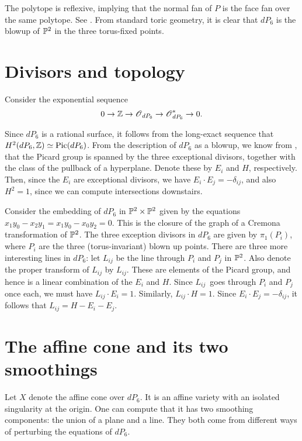 The polytope is reflexive, implying that the normal fan of $P$ is the face fan over the same polytope. See . From standard toric geometry, it is clear that $dP_6$ is the blowup of $\mathbb{P}^2$ in the three torus-fixed points. 

\section{Divisors and topology}

Consider the exponential sequence
\[
0 \to \mathbb{Z} \to \operatorname{\mathscr{O}}_{dP_6} \to \operatorname{\mathscr{O}}_{dP_6}^\ast \to 0.
\]

Since $dP_6$ is a rational surface, it follows from the long-exact sequence that $H^2(dP_6,\mathbb{Z}) \simeq \operatorname{Pic}(dP_6)$. From the description of $dP_6$ as a blowup, we know from \cite[Chapter V]{hartshorne}, that the Picard group is spanned by the three exceptional divisors, together with the class of the pullback of a hyperplane. Denote these by $E_i$ and $H$, respectively. Then, since the $E_i$ are exceptional divisors, we have $E_i \cdot E_j = -\delta_{ij}$, and also $H^2=1$, since we can compute intersections downstairs.

Consider the embedding of $dP_6$ in $\mathbb{P}^2 \times \mathbb{P}^2$ given by the equations $x_1y_0-x_2y_1=x_1y_0-x_0y_2=0$. This is the closure of the graph of a Cremona transformation of $\mathbb{P}^2$. The three exception divisors in $dP_6$ are given by $\pi_1(P_i)$, where $P_i$ are the three (torus-invariant) blown up points. There are three more interesting lines in $dP_6$: let $L_{ij}$ be the line through $P_i$ and $P_j$ in $\mathbb{P}^2$. Also denote the proper transform of $L_{ij}$ by $L_{ij}$. These are elements of the Picard group, and hence is a linear combination of the $E_i$ and $H$. Since $L_{ij}$ goes through $P_i$ and $P_j$ once each, we must have $L_{ij} \cdot E_i = 1$. Similarly, $L_{ij} \cdot H=1$. Since $E_i \cdot E_j=-\delta_{ij}$, it follows that $L_{ij}=H-E_i-E_j$. 


\section{The affine cone and its two smoothings}

Let $X$ denote the affine cone over $dP_6$. It is an affine variety with an isolated singularity at the origin. One can compute that it has two smoothing components: the union of a plane and a line. They both come from different ways of perturbing the equations of $dP_6$.

